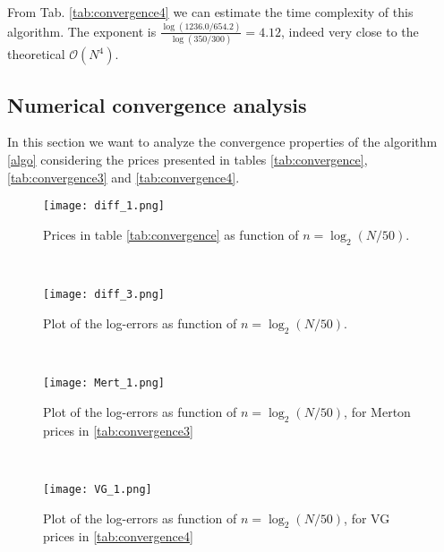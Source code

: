 From Tab. \ref{tab:convergence4} we can estimate the time complexity of this algorithm. The exponent is $\frac{\log(1236.0/654.2)}{\log(350/300)} = 4.12$, 
indeed very close to the theoretical $\mathcal{O}(N^4)$. 


\subsection{Numerical convergence analysis}\label{num_conv_analysis}

In this section we want to analyze the convergence properties of the algorithm \ref{algo} considering the prices presented in 
tables \ref{tab:convergence}, \ref{tab:convergence3} and \ref{tab:convergence4}. 

\begin{figure}[t!]
 \begin{minipage}[b]{0.5\linewidth}
   \centering
   \texttt{[image: diff\_1.png]}
   \caption{Prices in table \ref{tab:convergence} as function of $n=\log_2(N/50)$.}
   \label{Fig_err1} 
 \end{minipage}
  \
  \begin{minipage}[b]{0.5\linewidth}
  \centering
   \texttt{[image: diff\_3.png]}
   \caption{Plot of the log-errors as function of $n=\log_2(N/50)$.}
   \label{Fig_err3}
 \end{minipage}
 \
  \begin{minipage}[b]{0.5\linewidth}
   \centering
   \texttt{[image: Mert\_1.png]}
   \caption{Plot of the log-errors as function of $n=\log_2(N/50)$, for Merton prices in \ref{tab:convergence3}}
   \label{Fig_err4} 
 \end{minipage}
 \
 \begin{minipage}[b]{0.5\linewidth}
   \texttt{[image: VG\_1.png]}
   \caption{Plot of the log-errors as function of $n=\log_2(N/50)$, for VG prices in \ref{tab:convergence4}}
   \label{Fig_err5}
 \end{minipage}
\end{figure} 

